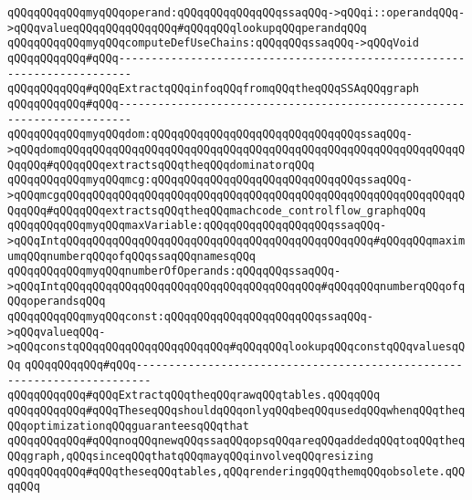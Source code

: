 \verb|qQQqqQQqqQQqmyqQQqoperand:qQQqqQQqqQQqqQQqssaqQQq->qQQqi::operandqQQq->qQQqvalueqQQqqQQqqQQqqQQq#qQQqqQQqlookupqQQqperandqQQq|\newline
\verb|qQQqqQQqqQQqmyqQQqcomputeDefUseChains:qQQqqQQqssaqQQq->qQQqVoid|\newline
\newline
\verb|qQQqqQQqqQQq#qQQq------------------------------------------------------------------------|\newline
\verb|qQQqqQQqqQQq#qQQqExtractqQQqinfoqQQqfromqQQqtheqQQqSSAqQQqgraph|\newline
\verb|qQQqqQQqqQQq#qQQq------------------------------------------------------------------------|\newline
\verb|qQQqqQQqqQQqmyqQQqdom:qQQqqQQqqQQqqQQqqQQqqQQqqQQqqQQqssaqQQq->qQQqdomqQQqqQQqqQQqqQQqqQQqqQQqqQQqqQQqqQQqqQQqqQQqqQQqqQQqqQQqqQQqqQQqqQQq#qQQqqQQqextractsqQQqtheqQQqdominatorqQQq|\newline
\verb|qQQqqQQqqQQqmyqQQqmcg:qQQqqQQqqQQqqQQqqQQqqQQqqQQqqQQqssaqQQq->qQQqmcgqQQqqQQqqQQqqQQqqQQqqQQqqQQqqQQqqQQqqQQqqQQqqQQqqQQqqQQqqQQqqQQqqQQq#qQQqqQQqextractsqQQqtheqQQqmachcode_controlflow_graphqQQq|\newline
\verb|qQQqqQQqqQQqmyqQQqmaxVariable:qQQqqQQqqQQqqQQqqQQqssaqQQq->qQQqIntqQQqqQQqqQQqqQQqqQQqqQQqqQQqqQQqqQQqqQQqqQQqqQQq#qQQqqQQqmaximumqQQqnumberqQQqofqQQqssaqQQqnamesqQQq|\newline
\verb|qQQqqQQqqQQqmyqQQqnumberOfOperands:qQQqqQQqssaqQQq->qQQqIntqQQqqQQqqQQqqQQqqQQqqQQqqQQqqQQqqQQqqQQq#qQQqqQQqnumberqQQqofqQQqoperandsqQQq|\newline
\verb|qQQqqQQqqQQqmyqQQqconst:qQQqqQQqqQQqqQQqqQQqqQQqssaqQQq->qQQqvalueqQQq->qQQqconstqQQqqQQqqQQqqQQqqQQqqQQq#qQQqqQQqlookupqQQqconstqQQqvaluesqQQq|\newline
\newline
\verb|qQQqqQQqqQQq#qQQq------------------------------------------------------------------------|\newline
\verb|qQQqqQQqqQQq#qQQqExtractqQQqtheqQQqrawqQQqtables.qQQqqQQq|\newline
\verb|qQQqqQQqqQQq#qQQqTheseqQQqshouldqQQqonlyqQQqbeqQQqusedqQQqwhenqQQqtheqQQqoptimizationqQQqguaranteesqQQqthat|\newline
\verb|qQQqqQQqqQQq#qQQqnoqQQqnewqQQqssaqQQqopsqQQqareqQQqaddedqQQqtoqQQqtheqQQqgraph,qQQqsinceqQQqthatqQQqmayqQQqinvolveqQQqresizing|\newline
\verb|qQQqqQQqqQQq#qQQqtheseqQQqtables,qQQqrenderingqQQqthemqQQqobsolete.qQQqqQQq|\newline
